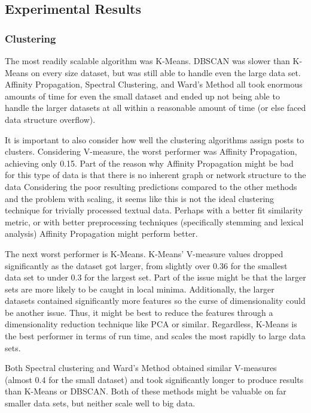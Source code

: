 \documentclass[letterpaper,10pt]{article}
\begin{document}
\subsection{Experimental Results}

\subsubsection{Clustering}

The most readily scalable algorithm was K-Means. DBSCAN was slower than
K-Means on every size dataset, but was still able to handle even the large
data set. Affinity Propagation, Spectral Clustering, and Ward's Method all
took enormous amounts of time for even the small dataset and ended up not
being able to handle the larger datasets at all within a reasonable amount
of time (or else faced data structure overflow).

It is important to also consider how well the clustering algorithms assign
posts to clusters. Considering V-measure, the worst performer was Affinity
Propagation, achieving only 0.15. Part of the reason why Affinity
Propagation might be bad for this type of data is that there is no inherent
graph or network structure to the data Considering the poor
resulting predictions compared to the other methods and the problem with
scaling, it seems like this is not the ideal clustering technique for
trivially processed textual data. Perhaps with a better fit similarity
metric, or with better preprocessing techniques (specifically stemming and
lexical analysis) Affinity Propagation might perform better.

The next worst performer is K-Means. K-Means' V-measure values dropped
significantly as the dataset got larger, from slightly over 0.36
for the smallest data set to under 0.3 for the largest set. Part of the
issue might be that the larger sets are more likely to be caught in local
minima. Additionally, the larger datasets contained significantly more
features so the curse of dimensionality could be another issue. Thus, it
might be best to reduce the features through a dimensionality reduction
technique like PCA or similar. Regardless, K-Means is the best performer
in terms of run time, and scales the most rapidly to large data sets.

Both Spectral clustering and Ward's Method obtained similar V-measures
(almost 0.4 for the small dataset) and took significantly longer to produce
results than K-Means or DBSCAN. Both of these methods might be valuable on
far smaller data sets, but neither scale well to big data.
\end{document}

